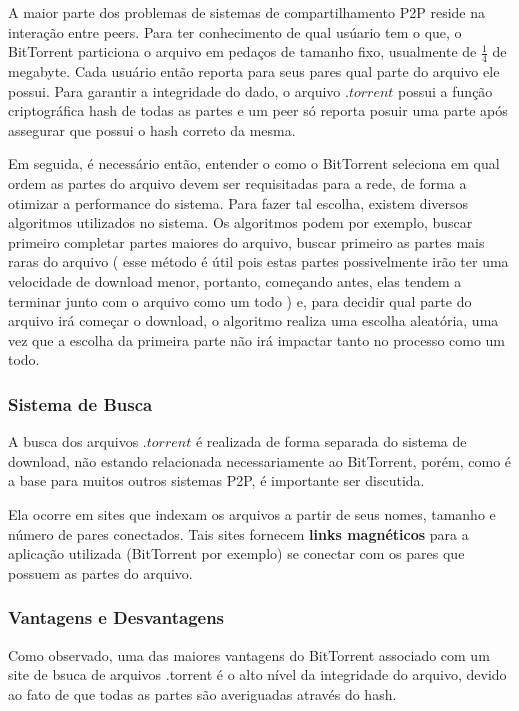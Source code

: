 \documentclass[a4paper]{article}
\begin{document}
A maior parte dos problemas de sistemas de compartilhamento P2P reside na interação entre peers. Para ter conhecimento de qual usúario tem o que, o BitTorrent particiona o arquivo em pedaços de tamanho fixo, usualmente de $\frac{1}{4}$ de megabyte. Cada usuário então reporta para seus pares qual parte do arquivo ele possui. Para garantir a integridade do dado, o arquivo $.torrent$ possui a função criptográfica hash de todas as partes e um peer só reporta posuir uma parte após assegurar que possui o hash correto da mesma.\cite{CohenBIT}

Em seguida, é necessário então, entender o como o BitTorrent seleciona em qual ordem as partes do arquivo devem ser requisitadas para a rede, de forma a otimizar a performance do sistema. Para fazer tal escolha, existem diversos algoritmos utilizados no sistema. Os algoritmos podem por exemplo, buscar primeiro completar partes maiores do arquivo, buscar primeiro as partes mais raras do arquivo ( esse método é útil pois estas partes possivelmente irão ter uma velocidade de download menor, portanto, começando antes, elas tendem a terminar junto com o arquivo como um todo ) e, para decidir qual parte do arquivo irá começar o download, o algoritmo realiza uma escolha aleatória, uma vez que a escolha da primeira parte não irá impactar tanto no processo como um todo.\cite{CohenBIT}  
\subsubsection{Sistema de Busca}
A busca dos arquivos $.torrent$ é realizada de forma separada do sistema de download, não estando relacionada necessariamente ao BitTorrent, porém, como é a base para muitos outros sistemas P2P, é importante ser discutida.

Ela ocorre em sites que indexam os arquivos a partir de seus nomes, tamanho e número de pares conectados. Tais sites fornecem \textbf{links magnéticos} para a aplicação utilizada (BitTorrent por exemplo) se conectar com os pares que possuem as partes do arquivo. 

\subsubsection{Vantagens e Desvantagens}
Como observado, uma das maiores vantagens do BitTorrent associado com um site de bsuca de arquivos .torrent é o alto nível da integridade do arquivo, devido ao fato de que todas as partes são averiguadas através do hash\cite{CohenBIT}.
\end{document}
